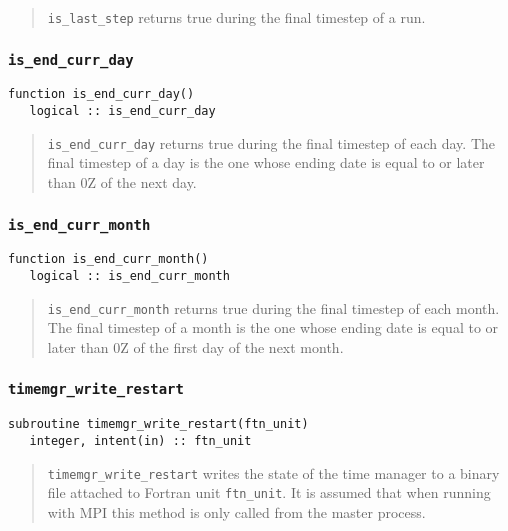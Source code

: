 \documentclass[12pt]{article}
\newcommand{\code}[1]{\texttt{#1}}
\begin{document}
\begin{quote}
\code{is\_last\_step} returns true during the final timestep of a run.
\end{quote}

\subsubsection{\code{is\_end\_curr\_day}}
\begin{verbatim}
function is_end_curr_day()
   logical :: is_end_curr_day
\end{verbatim}

\begin{quote}
\code{is\_end\_curr\_day} returns true during the final timestep of each
day.  The final timestep of a day is the one whose ending date is equal to
or later than 0Z of the next day.
\end{quote}

\subsubsection{\code{is\_end\_curr\_month}}
\begin{verbatim}
function is_end_curr_month()
   logical :: is_end_curr_month
\end{verbatim}

\begin{quote}
\code{is\_end\_curr\_month} returns true during the final timestep of each
month.  The final timestep of a month is the one whose ending date is equal to
or later than 0Z of the first day of the next month.
\end{quote}

\subsubsection{\code{timemgr\_write\_restart}}
\begin{verbatim}
subroutine timemgr_write_restart(ftn_unit)
   integer, intent(in) :: ftn_unit
\end{verbatim}

\begin{quote}
\code{timemgr\_write\_restart} writes the state of the time manager to a
binary file attached to Fortran unit \code{ftn\_unit}.  It is assumed that
when running with MPI this method is only called from the master process.
\end{quote}
\end{document}
